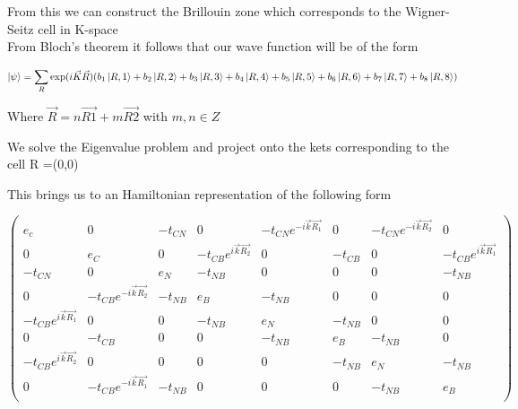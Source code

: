 \documentclass[a4paper]{article}
\begin{document}
From this we can construct the Brillouin zone which corresponds to the Wigner-Seitz cell in K-space\\

From Bloch's theorem it follows that our wave function will be of the form

\begin{equation}
\ket{\psi}=\sum_{R}\exp(i\vec{K}\vec{R})(b_{1}\ket{R,1} + b_{2}\ket{R,2}+
b_{3}\ket{R,3} + b_{4}\ket{R,4}+b_{5}\ket{R,5} +b_{6}\ket{R,6} +b_{7}\ket{R,7}+b_{8}\ket{R,8} )
\end{equation}


Where $\vec{R} = n\vec{R1} + m\vec{R2} $  with $m,n \in Z$

We solve the Eigenvalue problem and project onto the kets corresponding to the cell R =(0,0) 



This brings us to an Hamiltonian representation of the following form

\[ \left( \begin{array}{cccccccc}
e_c & 0 & -t_{CN} & 0 & -t_{CN}e^{-i\vec{k}\vec{R_1}} & 0 & -t_{CN}e^{-i\vec{k}\vec{R_2}} & 0\\
0 & e_C & 0 & -t_{CB}e^{i\vec{k}\vec{R_2}} & 0 & -t_{CB} & 0 & -t_{CB}e^{i\vec{k}\vec{R_1}}\\
-t_{CN} & 0 & e_N & -t_{NB} & 0 & 0 & 0 & -t_{NB}\\
0 & -t_{CB}e^{-i\vec{k}\vec{R_2}} & -t_{NB} & e_B & -t_{NB} & 0 & 0 & 0\\
-t_{CB}e^{i\vec{k}\vec{R_1}} & 0 & 0 & -t_{NB} & e_N & -t_{NB} & 0 & 0\\
0 & -t_{CB} & 0 & 0 & -t_{NB} & e_B & -t_{NB} & 0\\
-t_{CB}e^{i\vec{k}\vec{R_2}} & 0 & 0 & 0 & 0 & -t_{NB} & e_N & -t_{NB}\\
0 & -t_{CB}e^{-i\vec{k}\vec{R_1}} & -t_{NB} & 0 & 0 & 0 & -t_{NB} & e_B\\\end{array} \right)\] 
\end{document}
